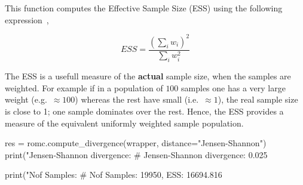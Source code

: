 \noindent
This function computes the Effective Sample Size (ESS) using the
following expression~\autocite{Sudman1967},

\begin{equation} \label{eq:ESS}
  ESS = \frac{(\sum_i w_i)^2}{\sum_i w_i^2}
\end{equation}

The ESS is a usefull measure of the \textbf{actual} sample size, when
the samples are weighted. For example if in a population of $100$
samples one has a very large weight (e.g.\ $\approx 100$) whereas the
rest have small (i.e.\ $\approx 1$), the real sample size is close to
1; one sample dominates over the rest. Hence, the ESS provides a
measure of the equivalent uniformly weighted sample population.

\begin{pythoncode}
res = romc.compute_divergence(wrapper, distance="Jensen-Shannon")                                 
print("Jensen-Shannon divergence: %
# Jensen-Shannon divergence: 0.025

print("Nof Samples: %
# Nof Samples: 19950, ESS: 16694.816
\end{pythoncode}